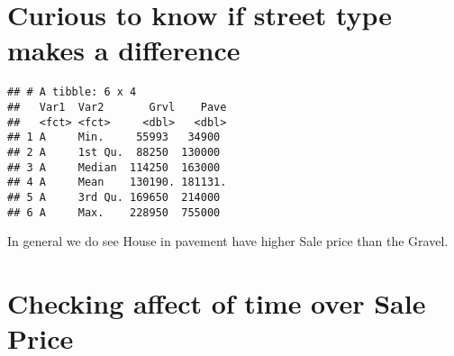 \documentclass[
]{article}
\newenvironment{Shaded}{\begin{snugshade}}{\end{snugshade}}
\newcommand{\DataTypeTok}[1]{\textcolor[rgb]{0.13,0.29,0.53}{#1}}
\newcommand{\KeywordTok}[1]{\textcolor[rgb]{0.13,0.29,0.53}{\textbf{#1}}}
\newcommand{\NormalTok}[1]{#1}
\newcommand{\OperatorTok}[1]{\textcolor[rgb]{0.81,0.36,0.00}{\textbf{#1}}}
\newcommand{\StringTok}[1]{\textcolor[rgb]{0.31,0.60,0.02}{#1}}
\begin{document}
\hypertarget{curious-to-know-if-street-type-makes-a-difference}{%
\section{Curious to know if street type makes a
difference}\label{curious-to-know-if-street-type-makes-a-difference}}

\begin{Shaded}
\end{Shaded}

\begin{verbatim}
## # A tibble: 6 x 4
##   Var1  Var2       Grvl    Pave
##   <fct> <fct>     <dbl>   <dbl>
## 1 A     Min.     55993   34900 
## 2 A     1st Qu.  88250  130000 
## 3 A     Median  114250  163000 
## 4 A     Mean    130190. 181131.
## 5 A     3rd Qu. 169650  214000 
## 6 A     Max.    228950  755000
\end{verbatim}

In general we do see House in pavement have higher Sale price than the
Gravel.

\hypertarget{checking-affect-of-time-over-sale-price}{%
\section{Checking affect of time over Sale
Price}\label{checking-affect-of-time-over-sale-price}}
\end{document}
